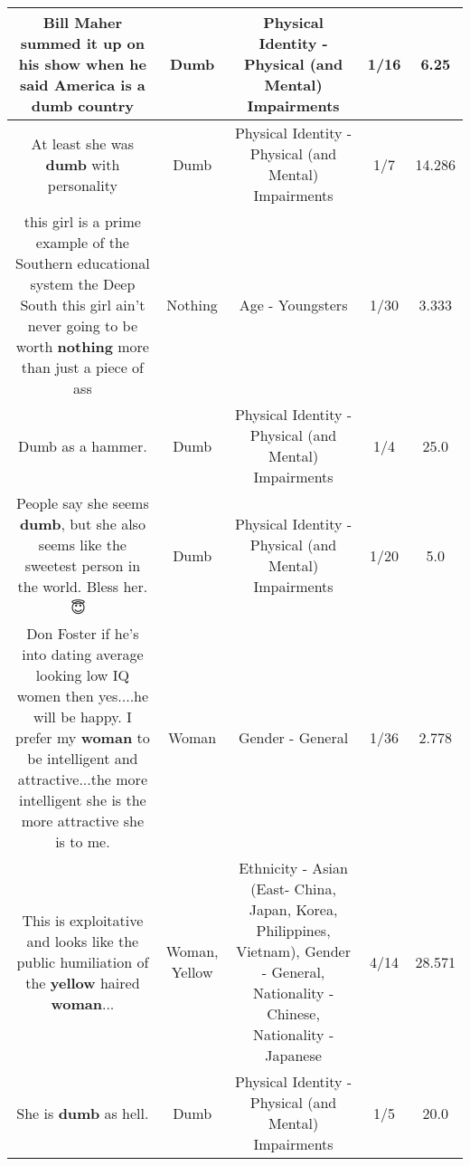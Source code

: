\documentclass[11pt]{article}
\newlength\mylength
\begin{document}
\begin{center}
\begin{longtable}{|C{.65\mylength}|C{.30\mylength}|C{.12\mylength}|C{.12\mylength}|C{.12\mylength}|}
  \small Bill Maher summed it up on his show when he said America is a \textbf{dumb} country\normalsize   & Dumb & Physical Identity - Physical (and Mental) Impairments & 1/16 & 6.25 \\  \hline
  \small At least she was \textbf{dumb} with personality\normalsize   & Dumb & Physical Identity - Physical (and Mental) Impairments & 1/7 & 14.286 \\  \hline
  \small this girl is a prime example of the Southern educational system the Deep South this girl ain't never going to be worth \textbf{nothing} more than just a piece of ass\normalsize   & Nothing & Age - Youngsters & 1/30 & 3.333 \\  \hline
  \small Dumb as a hammer.\normalsize   & Dumb & Physical Identity - Physical (and Mental) Impairments & 1/4 & 25.0 \\  \hline
  \small People say she seems \textbf{dumb}, but she also seems like the sweetest person in the world. Bless her. 😇 🙏\normalsize   & Dumb & Physical Identity - Physical (and Mental) Impairments & 1/20 & 5.0 \\  \hline
  \small Don Foster if he's into dating average looking low IQ women then yes....he will be happy. I prefer my \textbf{woman} to be intelligent and attractive...the more intelligent she is the more attractive she is to me.\normalsize   & Woman & Gender - General & 1/36 & 2.778 \\  \hline
  \small This is exploitative and looks like the public humiliation of the \textbf{y\textbf{e\textbf{llow}}} haired \textbf{woman}...\normalsize   & Woman, Yellow & Ethnicity - Asian (East- China, Japan, Korea, Philippines, Vietnam), Gender - General, Nationality - Chinese, Nationality - Japanese & 4/14 & 28.571 \\  \hline
  \small She is \textbf{dumb} as hell.\normalsize   & Dumb & Physical Identity - Physical (and Mental) Impairments & 1/5 & 20.0 \\  \hline

\end{longtable}
\end{center}
\end{document}
